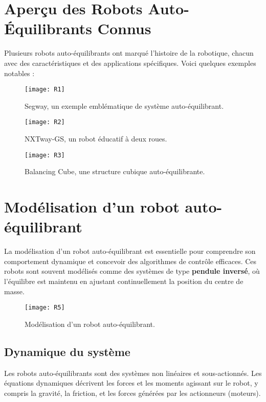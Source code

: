 \documentclass{report}
\begin{document}
\section{ Aperçu des Robots Auto-Équilibrants Connus}

Plusieurs robots auto-équilibrants ont marqué l'histoire de la robotique, chacun avec des caractéristiques et des applications spécifiques. Voici quelques exemples notables :


\begin{figure}[h]
    \centering
    \texttt{[image: R1]} %
    \caption{Segway, un exemple emblématique de système auto-équilibrant.}
\end{figure}


\begin{figure}[h]
    \centering
    \texttt{[image: R2]} %
    \caption{NXTway-GS, un robot éducatif à deux roues.}
\end{figure}


\begin{figure}[h]
    \centering
    \texttt{[image: R3]} %
    \caption{Balancing Cube, une structure cubique auto-équilibrante.}
\end{figure}
\vspace{12cm}

\section{Modélisation d’un robot auto-équilibrant}

La modélisation d'un robot auto-équilibrant est essentielle pour comprendre son comportement dynamique et concevoir des algorithmes de contrôle efficaces. Ces robots sont souvent modélisés comme des systèmes de type \textbf{pendule inversé}, où l'équilibre est maintenu en ajustant continuellement la position du centre de masse.

\begin{figure}[h]
    \centering
    \texttt{[image: R5]} %
    \caption{Modélisation d'un robot auto-équilibrant.}
\end{figure}

\subsection*{Dynamique du système}
Les robots auto-équilibrants sont des systèmes non linéaires et sous-actionnés. Les équations dynamiques décrivent les forces et les moments agissant sur le robot, y compris la gravité, la friction, et les forces générées par les actionneurs (moteurs).
\end{document}
